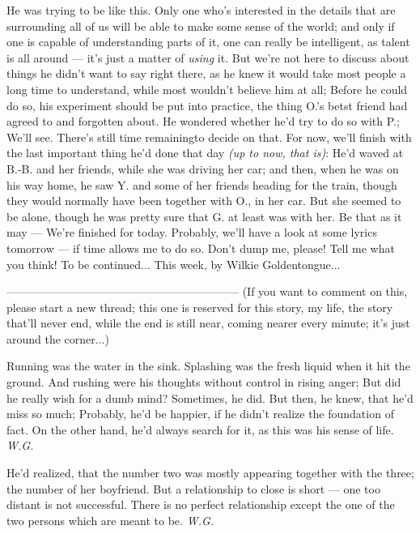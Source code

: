 He was trying to be like this. 
Only one who's interested in the details that are surrounding all of us will be able to make some sense of the world; and only if one is capable of understanding parts of it, one can really be intelligent, as talent is all around --- it's just a matter of \emph{using} it. 
But we're not here to discuss about things he didn't want to say right there, as he knew it would take most people a long time to understand, while most wouldn't believe him at all; Before he could do so, his experiment should be put into practice, the thing O.'s betst friend had agreed to and forgotten about. He wondered whether he'd try to do so with P.; We'll see. 
There's still time remainingto decide on that. 
For now, we'll finish with the last important thing he'd done that day \emph{(up to now, that is)}: He'd waved at B.-B. and her friends, while she was driving her car; and then, when he was on his way home, he saw Y. and some of her friends heading for the train, though they would normally have been together with O., in her car. But she seemed to be alone, though he was pretty sure that G. at least was with her. 
Be that as it may --- 
We're finished for today. 
Probably, we'll have a look at some lyrics tomorrow --- if time allows me to do so. 
Don't dump me, please!
Tell me what you think!
To be continued...
This week, by Wilkie Goldentongue...

--------------------------------------------------------------
(If you want to comment on this, please start a new thread; this one is reserved for this story, my life, the story that'll never end, while the end is still near, coming nearer every minute; it's just around the corner...)

Running 
was the water 
in the sink. 
Splashing 
was the fresh liquid 
when it hit the ground. 
And rushing were his thoughts 
without control 
in rising anger; 
But did he really wish 
for a dumb mind? 
Sometimes, he did. 
But then, he knew, 
that he'd miss so much; 
Probably, he'd be happier, 
if he didn't realize 
the foundation of fact. 
On the other hand, 
he'd always search for it, 
as this was his sense of life. 
\emph{W.G.}

He'd realized, 
that the number two 
was mostly appearing together 
with the three; 
the number of her boyfriend. 
But a relationship to close 
is short --- 
one too distant 
is not successful. 
There is no perfect relationship 
except the one 
of the two 
persons 
which are meant to be. 
\emph{W.G.}

